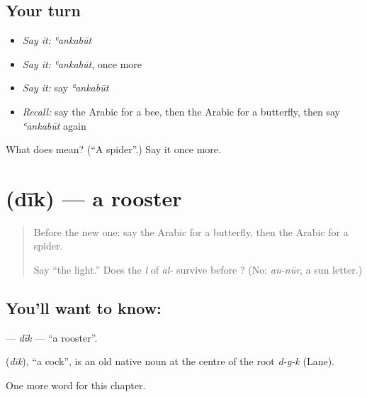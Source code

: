 \subsection*{Your turn}
\begin{itemize}
\raggedright
  \item \emph{Say it:} \emph{ʿankabūt}
  \item \emph{Say it:} \emph{ʿankabūt}, once more
  \item \emph{Say it:} say \emph{ʿankabūt}
  \item \emph{Recall:} say the Arabic for a bee, then the Arabic for a butterfly, then say \emph{ʿankabūt} again
\end{itemize}

\begin{tcolorbox}[breakable,colback=teal!4,colframe=teal!35!black,title={Before you move on}]
What does  mean? (\textquotedblleft{}A spider\textquotedblright{}.) Say it once more.
\end{tcolorbox}
\section[\texorpdfstring{\ar{ديك} (dīk)}{ديك (dīk)}]{ (dīk) — a rooster}

\label{lesson:AR-C137-dik}



\begin{quote}
Before the new one: say the Arabic for a butterfly, then the Arabic for a spider.

Say \textquotedblleft{}the light.\textquotedblright{} Does the \emph{l} of \emph{al-} survive before \textbf{}? (No: \emph{an-nūr}, a sun letter.)
\end{quote}

\subsection*{You'll want to know: }
\textbf{} — \emph{dīk} — \textquotedblleft{}a rooster\textquotedblright{}.

\begin{cousinweb}
\textbf{} (\emph{dīk}), \textquotedblleft{}a cock\textquotedblright{}, is an old native noun at the centre of the root \emph{d-y-k} (Lane).
\end{cousinweb}

\begin{grammarlens}[title={What you've built}]
One more word for this chapter.
\end{grammarlens}

